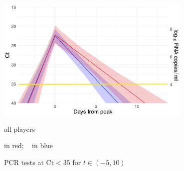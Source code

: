 \documentclass[9pt]{report}
\begin{document}

\includegraphics[width=0.7\textwidth]{img/bball-days-from-peak.png}
\begin{subitemize}
\vspace*{-3pt}
\item all players 
\vspace*{-3pt}
\item {} in red; \  in blue
\vspace*{-3pt}
\item PCR tests  at $\textrm{Ct} < 35$ for $t \in (-5, 10)$
\end{subitemize}

\end{document}
